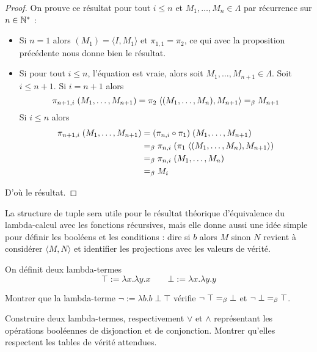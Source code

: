 \begin{proof}
    On prouve ce résultat pour tout $i\leq n$ et $M_1,\ldots,M_n\in\Lambda$ par récurrence sur $n\in\mathbb{N}^*$ :
    \begin{itemize}[label=$\bullet$]
        \item Si $n = 1$ alors $(M_1) = \langle I,M_1\rangle$ et $\pi_{1,1} = \pi_2$, ce qui avec la proposition précédente nous donne bien le résultat.
        \item Si pour tout $i\leq n$, l'équation est vraie, alors soit $M_1,\ldots,M_{n+1}\in\Lambda$. Soit $i\leq n+1$. Si $i = n+1$ alors $$\pi_{n+1,i}\;(M_1,\ldots,M_{n+1}) = \pi_2\;\langle (M_1,\ldots,M_n),M_{n+1}\rangle =_\beta M_{n+1}$$ Si $i \leq n$ alors 
        \begin{align*}
            \pi_{n+1,i}\;(M_1,\ldots,M_{n+1}) &= (\pi_{n,i}\circ \pi_1)\;(M_1,\ldots,M_{n+1})\\
            &=_\beta \pi_{n,i}\;(\pi_1\;\langle (M_1,\ldots,M_n),M_{n+1}\rangle)\\
            &=_\beta \pi_{n,i}\;(M_1,\ldots,M_n)\\
            &=_\beta M_i
        \end{align*}
    \end{itemize}

    D'où le résultat.
\end{proof}

La structure de tuple sera utile pour le résultat théorique d'équivalence du lambda-calcul avec les fonctions récursives, mais elle donne aussi une idée simple pour définir les booléens et les conditions : dire \og si $b$ alors $M$ sinon $N$\fg{} revient à considérer $\langle M,N\rangle$ et identifier les projections avec les valeurs de vérité.

\begin{defi}[Booléen]
    On définit deux lambda-termes $$\top := \lambda x.\lambda y.x\qquad \bot := \lambda x.\lambda y.y$$
\end{defi}

\begin{exo}
    Montrer que la lambda-terme $\lnot := \lambda b. b\;\bot\;\top$ vérifie $\lnot\;\top =_\beta \bot$ et $\lnot\;\bot =_\beta \top$.
\end{exo}

\begin{exo}
    Construire deux lambda-termes, respectivement $\lor$ et $\land$ représentant les opérations booléennes de disjonction et de conjonction. Montrer qu'elles respectent les tables de vérité attendues.
\end{exo}

